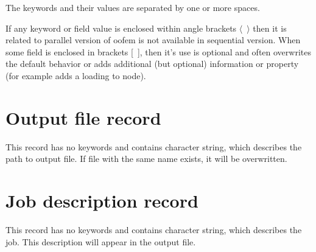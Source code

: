 \documentclass[draft]{article}
\newcommand{\Pmode}[1]{{\sffamily #1}}
\begin{document}
The keywords and their values are separated by one or more spaces.

\Pmode{If any keyword or field value is enclosed within angle brackets $\langle$~$\rangle$ then it is related to parallel version of oofem is not available in sequential version. 
When some field is enclosed in brackets [~], then it's use is optional
and often overwrites the default behavior or adds additional (but
optional) information or property (for example adds a loading to
node). }

\section{Output file record}
\label{_OutputFileRecord}
This record has no keywords and contains character string, which
describes the path to output file. If file with the same name exists,
it will be overwritten.

\section{Job description record}
\label{_JobDescriptionRecord}
This record has no keywords and contains character string, which
describes the job. This description will appear in the output
file.
\end{document}
